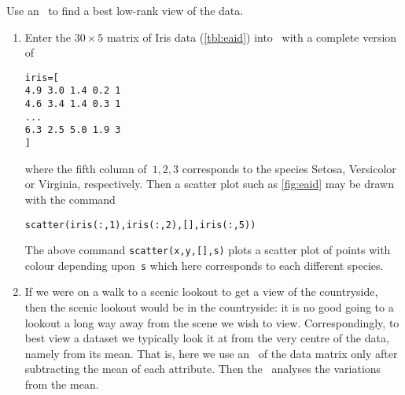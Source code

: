\begin{example}
\begin{solution} 
Use an \svd\ to find a best low-rank view of the data.
\begin{enumerate}
\item Enter the \(30\times5\) matrix of Iris data (\autoref{tbl:eaid}) into \script\  with a complete version of
\begin{verbatim}
iris=[
4.9 3.0 1.4 0.2 1
4.6 3.4 1.4 0.3 1
...
6.3 2.5 5.0 1.9 3
]
\end{verbatim}
where the fifth column of~\(1,2,3\) corresponds to the species Setosa, Versicolor or Virginia, respectively.
\setbox\ajrqrbox\hbox{}%
\marginpar{\usebox{\ajrqrbox\\[2ex]}}%
Then a scatter plot such as \autoref{fig:eaid} may be drawn with the command
\begin{verbatim}
scatter(iris(:,1),iris(:,2),[],iris(:,5))
\end{verbatim}
The above command \verb|scatter(x,y,[],s)|  plots a scatter plot of points with colour depending upon~\verb|s| which here corresponds to each different species.

\item If we were on a walk to a scenic lookout to get a view of the countryside, then the scenic lookout would be in the countryside: it is no good going to a lookout a long way away from the scene we wish to view.
Correspondingly, to best view a dataset we typically look it at from the very centre of the data, namely from its mean.
That is, here we use an \svd\ of the data matrix only after subtracting the mean of each attribute.
Then the \svd\ analyses the variations from the mean.


\end{enumerate}
\end{solution}
\end{example}
